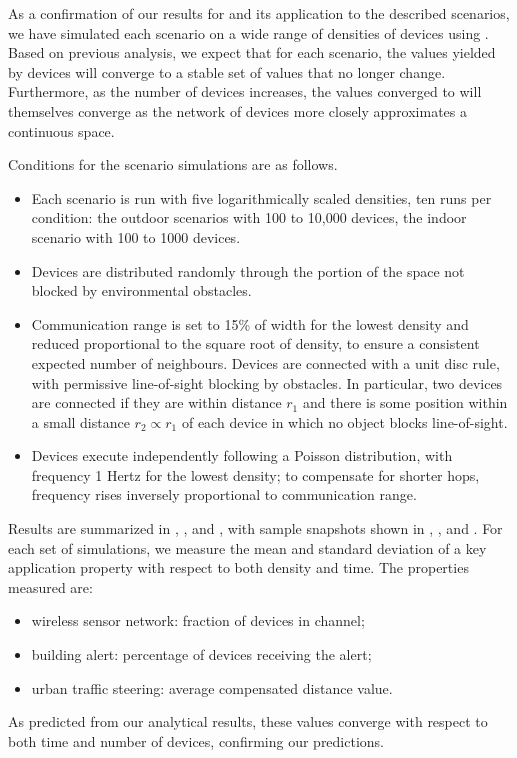 \documentclass[12pt,a4paper,twoside,openright]{book}
\begin{document}
As a confirmation of our results for \calculus{} and its application to the described scenarios, we have simulated each scenario on a wide range of densities of devices using \alchemist{}.
%
Based on previous analysis, we expect that for each scenario, the values yielded by devices will converge to a stable set of values that no longer change.
%
Furthermore, as the number of devices increases, the values converged to will themselves converge as the network of devices more closely approximates a continuous space.

Conditions for the scenario simulations are as follows.
\begin{itemize}
 \item Each scenario is run with five logarithmically scaled densities, ten runs per condition: the outdoor scenarios with 100 to 10,000 devices, the indoor scenario with 100 to 1000 devices.
 \item Devices are distributed randomly through the portion of the space not blocked by environmental obstacles.
 \item Communication range is set to 15\% of width for the lowest density and reduced proportional to the square root of density, to ensure a consistent expected number of neighbours.
 Devices are connected with a unit disc rule, with permissive line-of-sight blocking by obstacles.
 In particular, two devices are connected if they are within distance $r_1$ and there is some position within a small distance $r_2 \propto r_1$ of each device in which no object blocks line-of-sight.
 \item Devices execute independently following a Poisson distribution, with frequency 1 Hertz for the lowest density; to compensate for shorter hops, frequency rises inversely proportional to communication range.
\end{itemize}

Results are summarized in , , and , with sample snapshots shown in , , and .  For each set of simulations, we measure the mean and standard deviation of a key application property with respect to both density and time.
%
The properties measured are:
\begin{itemize}
 \item wireless sensor network: fraction of devices in channel;  
 \item building alert: percentage of devices receiving the alert;
 \item urban traffic steering: average compensated distance value.
\end{itemize}
\noindent
As predicted from our analytical results, these values converge with respect to both time and number of devices, confirming our predictions.
\end{document}
